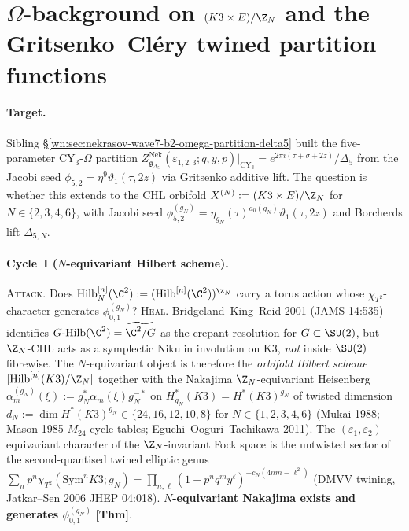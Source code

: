 
\section{$\Omega$-background on
\texorpdfstring{$(K3\times E)/\Z_N$}{CHL orbifolds}
and the Gritsenko--Cl\'ery twined partition functions}
\label{wn:sec:nekrasov-wave8-i5-CHL-extension-delta5N}

\providecommand{\ClaimStatusTheorem}{\textbf{[Thm]}}
\providecommand{\ClaimStatusConjectured}{\textbf{[Conj]}}
\providecommand{\ClaimStatusAxiomatic}{\textbf{[Ax]}}
\providecommand{\fg}{\mathfrak{g}}
\providecommand{\Hilb}{\mathrm{Hilb}}
\providecommand{\fgDelN}{\fg_{\Delta_{5,N}}}
\providecommand{\ZNek}{Z^{\mathrm{Nek}}}

\paragraph{Target.} Sibling
\S\ref{wn:sec:nekrasov-wave7-b2-omega-partition-delta5} built the
five-parameter CY$_3$-$\Omega$ partition $\ZNek_{\fg_{\Delta_5}}
(\varepsilon_{1,2,3};q,y,p)|_{\mathrm{CY}_3}=e^{2\pi
i(\tau+\sigma+2z)}/\Delta_5$ from the Jacobi seed
$\phi_{5,2}=\eta^9\vartheta_1(\tau,2z)$ via Gritsenko additive lift.
The question is whether this extends to the CHL orbifold
$X^{(N)}:=(K3\times E)/\Z_N$ for $N\in\{2,3,4,6\}$, with Jacobi seed
$\phi^{(g_N)}_{5,2}=\eta_{g_N}(\tau)^{a_0(g_N)}\vartheta_1(\tau,2z)$
and Borcherds lift $\Delta_{5,N}$.

\paragraph{Cycle~I ($N$-equivariant Hilbert scheme).}
\textsc{Attack.} Does $\Hilb^{[n]}_N(\C^2):=
(\Hilb^{[n]}(\C^2))^{\Z_N}$ carry a torus action whose
$\chi_{T^2}$-character generates $\phi^{(g_N)}_{0,1}$?
\textsc{Heal.} Bridgeland--King--Reid 2001 \textup{(}JAMS 14:535\textup{)}
identifies $G\text{-}\Hilb(\C^2)=\widetilde{\C^2/G}$ as the crepant
resolution for $G\subset\SU(2)$, but $\Z_N$-CHL acts as a symplectic
Nikulin involution on K3, \emph{not} inside $\SU(2)$ fibrewise. The
$N$-equivariant object is therefore the
\emph{orbifold Hilbert scheme} $[\Hilb^{[n]}(K3)/\Z_N]$ together with
the Nakajima $\Z_N$-equivariant Heisenberg
$\alpha^{(g_N)}_m(\xi):=g_N^{\ast}\alpha_m(\xi)g_N^{-\ast}$ on
$H^\ast_{g_N}(K3)=H^\ast(K3)^{g_N}$ of twisted dimension
$d_N:=\dim H^\ast(K3)^{g_N}\in\{24,16,12,10,8\}$ for
$N\in\{1,2,3,4,6\}$ \textup{(}Mukai 1988; Mason 1985 $M_{24}$ cycle
tables; Eguchi--Ooguri--Tachikawa 2011\textup{)}. The
$(\varepsilon_1,\varepsilon_2)$-equivariant character of the
$\Z_N$-invariant Fock space is the untwisted sector of the
second-quantised twined elliptic genus
$\sum_n p^n\chi_{T^2}(\mathrm{Sym}^n K3;g_N)=\prod_{n,\ell}
(1-p^n q^m y^\ell)^{-c_N(4nm-\ell^2)}$
\textup{(}DMVV twining, Jatkar--Sen 2006 JHEP 04:018\textup{)}.
\textbf{$N$-equivariant Nakajima exists and generates
$\phi^{(g_N)}_{0,1}$} \ClaimStatusTheorem.

